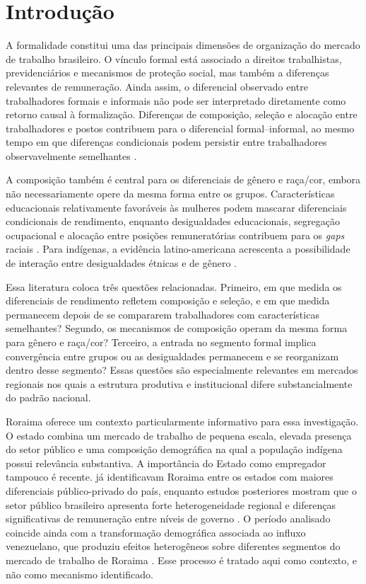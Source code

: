 \documentclass[12pt]{article}
\begin{document}
\newpage

\section{Introdução}
\label{sec:introducao}

A formalidade constitui uma das principais dimensões de organização do mercado de trabalho 
brasileiro. O vínculo formal está associado a direitos trabalhistas, previdenciários e 
mecanismos de proteção social, mas também a diferenças relevantes de remuneração. Ainda 
assim, o diferencial observado entre trabalhadores formais e informais não pode ser 
interpretado diretamente como retorno causal à formalização. Diferenças de composição, 
seleção e alocação entre trabalhadores e postos contribuem para o diferencial formal–informal, 
ao mesmo tempo em que diferenças condicionais podem persistir entre trabalhadores 
observavelmente semelhantes \citep{ulyssea2006, curi2006, meghir2015, ulyssea2018}.

A composição também é central para os diferenciais de gênero e raça/cor, embora não 
necessariamente opere da mesma forma entre os grupos. Características educacionais 
relativamente favoráveis às mulheres podem mascarar diferenciais condicionais de 
rendimento, enquanto desigualdades educacionais, segregação ocupacional e alocação 
entre posições remuneratórias contribuem para os \textit{gaps} raciais 
\citep{giuberti2005, soares2000, campante2004, gerard2021}. Para indígenas, a 
evidência latino-americana acrescenta a possibilidade de interação entre desigualdades 
étnicas e de gênero \citep{kolev2015}.

Essa literatura coloca três questões relacionadas. Primeiro, em que medida os 
diferenciais de rendimento refletem composição e seleção, e em que medida permanecem 
depois de se compararem trabalhadores com características semelhantes? Segundo, 
os mecanismos de composição operam da mesma forma para gênero e raça/cor? Terceiro, 
a entrada no segmento formal implica convergência entre grupos ou as desigualdades 
 permanecem e se reorganizam dentro desse segmento? Essas questões são especialmente 
 relevantes em mercados regionais nos quais a estrutura produtiva e institucional 
 difere substancialmente do padrão nacional.

Roraima oferece um contexto particularmente informativo para essa investigação. O estado 
combina um mercado de trabalho de pequena escala, elevada presença do setor público e 
uma composição demográfica na qual a população indígena possui relevância substantiva. 
A importância do Estado como empregador tampouco é recente. \citet{moriconi2009} já 
identificavam Roraima entre os estados com maiores diferenciais público-privado do país, 
enquanto estudos posteriores mostram que o setor público brasileiro apresenta forte 
heterogeneidade regional e diferenças significativas de remuneração entre níveis de 
governo \citep{mattos2022, baez2021}. O período analisado coincide ainda com a 
transformação demográfica associada ao influxo venezuelano, que produziu efeitos 
heterogêneos sobre diferentes segmentos do mercado de trabalho de Roraima 
\citep{ryu2022, santanna2024}. Esse processo é tratado aqui como contexto, e 
não como mecanismo identificado.
\end{document}
